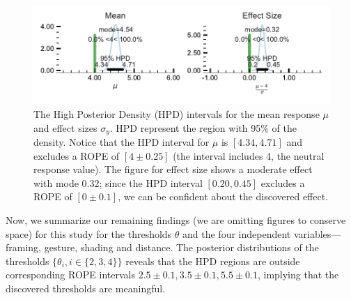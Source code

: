 \begin{figure}[tb]
	\centering
	\includegraphics[width=\columnwidth]{./hari-code/factors_mean_effect_main-noint.pdf}
	\caption{The High Posterior Density (HPD) intervals for the mean response $\mu$ and effect sizes $\sigma_y$. HPD represent the region with 95\% of the density. Notice that the HPD interval for $\mu$ is $[4.34, 4.71]$ and excludes a ROPE of $[4\pm 0.25]$ (the interval includes 4, the neutral response value). The figure for effect size shows a moderate effect with mode $0.32$; since the HPD interval $[0.20, 0.45]$ excludes a ROPE of $[0\pm 0.1]$, we can be confident about the discovered effect.}
	\label{fig:mean-effect}
\end{figure}
Now, we summarize our remaining findings (we are omitting figures to conserve space) for this study for the thresholds $\theta$ and the four independent variables---framing, gesture, shading and distance. The posterior distributions of the thresholds $\{\theta_i, i \in \{2,3,4\}\}$ reveals that the HPD regions are outside corresponding ROPE intervals $2.5 \pm 0.1, 3.5 \pm 0.1, 5.5 \pm 0.1$, implying that the discovered thresholds are meaningful.






